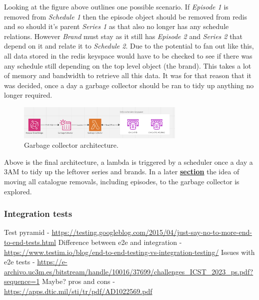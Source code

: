   Looking at the figure above outlines one possible scenario. If \emph{Episode 1} is removed from \emph{Schedule 1} then the episode object should be removed
  from redis and so should it's parent \emph{Series 1} as that also no longer has any schedule relations. However \emph{Brand} must stay as it still
  has \emph{Episode 2} and \emph{Series 2} that depend on it and relate it to \emph{Schedule 2}. Due to the potential to fan out like this, all data stored
  in the redis keyspace would have to be checked to see if there was any schedule still depending on the top level object (the brand). This takes a lot of
  memory and bandwidth to retrieve all this data. It was for that reason that it was decided, once a day a garbage collector should be ran to 
  tidy up anything no longer required.

  \begin{figure}[H]
    \centering
    \includegraphics[width=8cm]{assets/architectures/garbageCollector.png}
    \caption{Garbage collector architecture.}
    \label{fig:garbageCollectorArchitecture}
  \end{figure}

  Above is the final architecture, a lambda is triggered by a scheduler once a day a 3AM to tidy up the leftover series and brands. In a later
  \hyperref[sec:conclusion]{\textbf{section}} the idea of moving all catalogue removals, including episodes, to the garbage collector is explored.

  \newpage
  \subsubsection{Integration tests}

  Test pyramid - \url{https://testing.googleblog.com/2015/04/just-say-no-to-more-end-to-end-tests.html}
  Difference between e2e and integration - \url{https://www.testim.io/blog/end-to-end-testing-vs-integration-testing/}
  Issues with e2e tests - \url{https://e-archivo.uc3m.es/bitstream/handle/10016/37699/challenges_ICST_2023_ps.pdf?sequence=1}
  Maybe? pros and cons - \url{https://apps.dtic.mil/sti/tr/pdf/AD1022569.pdf}

  \newpage
